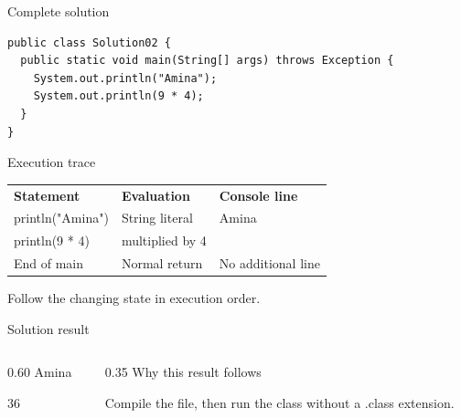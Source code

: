 \documentclass[10pt,aspectratio=169]{beamer}
\begin{document}
\begin{frame}[fragile,t]{Complete solution}
\begin{lstlisting}
public class Solution02 {
  public static void main(String[] args) throws Exception {
    System.out.println("Amina");
    System.out.println(9 * 4);
  }
}
\end{lstlisting}
\end{frame}

\begin{frame}[fragile,t]{Execution trace}
\small\renewcommand{\arraystretch}{1.5}
\begin{tabularx}{\textwidth}{>{\raggedright\arraybackslash}X>{\raggedright\arraybackslash}X>{\raggedright\arraybackslash}X}
\rowcolor{navy}
\color{white}\bfseries Statement & \color{white}\bfseries Evaluation & \color{white}\bfseries Console line\\
println("Amina") & String literal & Amina\\
println(9 * 4) & 9 multiplied by 4 & 36\\
End of main & Normal return & No additional line\\
\end{tabularx}
\vspace{3mm}\footnotesize Follow the changing state in execution order.
\end{frame}

\begin{frame}[fragile,t]{Solution result}
\begin{columns}[T,onlytextwidth]\begin{column}{0.60\textwidth}
Amina\par 36
\end{column}\begin{column}{0.35\textwidth}\small
Why this result follows

Compile the file, then run the class without a .class extension.
\end{column}\end{columns}
\end{frame}
\end{document}
